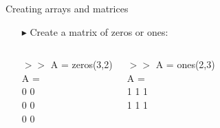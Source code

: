 \documentclass[xcolor={dvipsnames,rgb}, aspectratio=169]{beamer}
\begin{document}
\begin{frame}{Creating arrays and matrices}
\begin{itemize}
    \item[$\blacktriangleright$] Create a matrix of zeros or ones:
    \begin{columns}[T]%
        \begin{tcolorbox}[colback=white,colframe=bluepoli]
        $>>$ A = zeros(3,2) \\
        A = \\
        \hspace{3em} 0 \hspace{3em} 0 \\
        \hspace{3em} 0 \hspace{3em} 0 \\
        \hspace{3em} 0 \hspace{3em} 0
        \end{tcolorbox}
        \begin{tcolorbox}[colback=white,colframe=bluepoli]
        $>>$ A = ones(2,3) \\
        A = \\
        \hspace{3em} 1 \hspace{3em} 1 \hspace{3em} 1 \\
        \hspace{3em} 1 \hspace{3em} 1 \hspace{3em} 1 \\
        \end{tcolorbox}
    \end{columns}
\end{itemize}
\end{frame}
\end{document}
